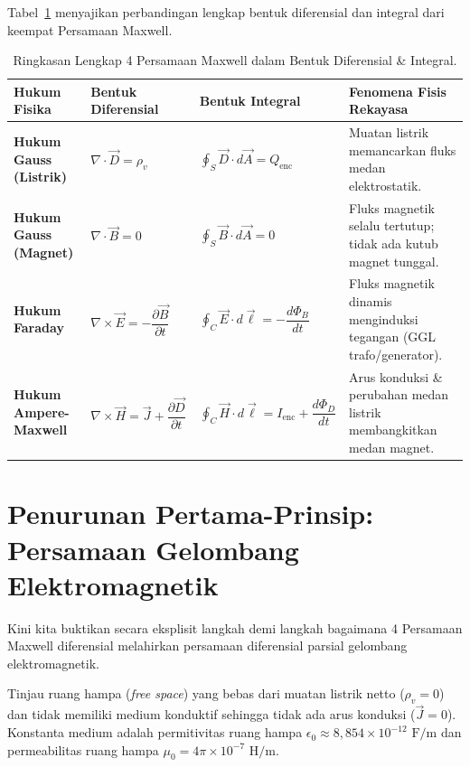 \documentclass[11pt,a4paper]{article}
\theoremstyle{definition}
\begin{document}
Tabel~\ref{tab:maxwell_summary} menyajikan perbandingan lengkap bentuk diferensial dan integral dari keempat Persamaan Maxwell.

\begin{table}[htbp]
\centering
\caption{Ringkasan Lengkap 4 Persamaan Maxwell dalam Bentuk Diferensial \& Integral.}
\label{tab:maxwell_summary}
\vspace{0.2cm}
\small
\begin{tabularx}{\linewidth}{>{\bfseries}l >{\centering\arraybackslash}X >{\centering\arraybackslash}X >{\raggedright\arraybackslash}X}
\toprule
\textbf{Hukum Fisika} & \textbf{Bentuk Diferensial} & \textbf{Bentuk Integral} & \textbf{Fenomena Fisis Rekayasa} \\
\midrule
Hukum Gauss (Listrik) & $\nabla \cdot \vec{D} = \rho_v$ & $\oint_S \vec{D} \cdot d\vec{A} = Q_{\text{enc}}$ & Muatan listrik memancarkan fluks medan elektrostatik. \\
\addlinespace
Hukum Gauss (Magnet) & $\nabla \cdot \vec{B} = 0$ & $\oint_S \vec{B} \cdot d\vec{A} = 0$ & Fluks magnetik selalu tertutup; tidak ada kutub magnet tunggal. \\
\addlinespace
Hukum Faraday & $\nabla \times \vec{E} = -\dfrac{\partial \vec{B}}{\partial t}$ & $\oint_C \vec{E} \cdot d\vec{\ell} = -\dfrac{d\Phi_B}{dt}$ & Fluks magnetik dinamis menginduksi tegangan (GGL trafo/generator). \\
\addlinespace
Hukum Ampere-Maxwell & $\nabla \times \vec{H} = \vec{J} + \dfrac{\partial \vec{D}}{\partial t}$ & $\oint_C \vec{H} \cdot d\vec{\ell} = I_{\text{enc}} + \dfrac{d\Phi_D}{dt}$ & Arus konduksi \& perubahan medan listrik membangkitkan medan magnet. \\
\bottomrule
\end{tabularx}
\end{table}

\section{Penurunan Pertama-Prinsip: Persamaan Gelombang Elektromagnetik}

Kini kita buktikan secara eksplisit langkah demi langkah bagaimana 4 Persamaan Maxwell diferensial melahirkan persamaan diferensial parsial gelombang elektromagnetik.

Tinjau ruang hampa (\textit{free space}) yang bebas dari muatan listrik netto ($\rho_v = 0$) dan tidak memiliki medium konduktif sehingga tidak ada arus konduksi ($\vec{J} = 0$). Konstanta medium adalah permitivitas ruang hampa $\epsilon_0 \approx 8{,}854 \times 10^{-12}\text{ F/m}$ dan permeabilitas ruang hampa $\mu_0 = 4\pi \times 10^{-7}\text{ H/m}$.
\end{document}
